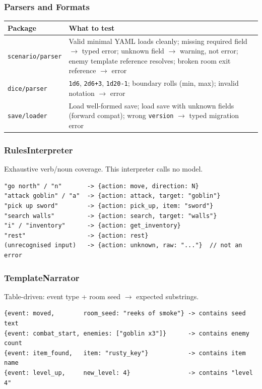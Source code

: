\documentclass[a4paper,10pt]{article}
\newcommand{\pkg}[1]{\texttt{#1}}
\begin{document}
\subsubsection{Parsers and Formats}

\begin{center}
\begin{tabular}{lp{9cm}}
\toprule
\textbf{Package} & \textbf{What to test} \\
\midrule
\pkg{scenario/parser}
  & Valid minimal YAML loads cleanly; missing required field $\to$ typed
    error; unknown field $\to$ warning, not error; enemy template
    reference resolves; broken room exit reference $\to$ error \\
\pkg{dice/parser}
  & \texttt{1d6}, \texttt{2d6+3}, \texttt{1d20-1}; boundary rolls
    (min, max); invalid notation $\to$ error \\
\pkg{save/loader}
  & Load well-formed save; load save with unknown fields (forward
    compat); wrong \texttt{version} $\to$ typed migration error \\
\bottomrule
\end{tabular}
\end{center}

\subsubsection{RulesInterpreter}

Exhaustive verb/noun coverage.  This interpreter calls no model.

\begin{lstlisting}[title={RulesInterpreter verb table (representative)}]
"go north" / "n"       -> {action: move, direction: N}
"attack goblin" / "a"  -> {action: attack, target: "goblin"}
"pick up sword"        -> {action: pick_up, item: "sword"}
"search walls"         -> {action: search, target: "walls"}
"i" / "inventory"      -> {action: get_inventory}
"rest"                 -> {action: rest}
(unrecognised input)   -> {action: unknown, raw: "..."}  // not an error
\end{lstlisting}

\subsubsection{TemplateNarrator}

Table-driven: event type + room seed $\to$ expected substrings.

\begin{lstlisting}[title={TemplateNarrator test cases (representative)}]
{event: moved,        room_seed: "reeks of smoke"} -> contains seed text
{event: combat_start, enemies: ["goblin x3"]}      -> contains enemy count
{event: item_found,   item: "rusty_key"}           -> contains item name
{event: level_up,     new_level: 4}                -> contains "level 4"
\end{lstlisting}
\end{document}
